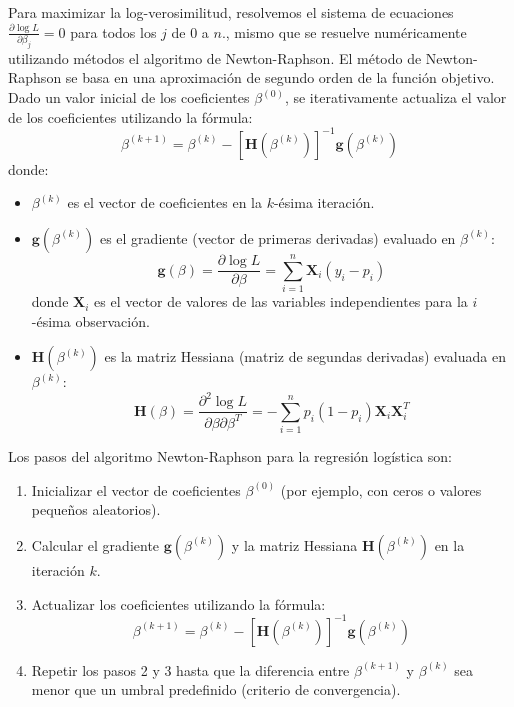 Para maximizar la log-verosimilitud, resolvemos el sistema de ecuaciones $\frac{\partial \log L}{\partial \beta_j} = 0$ para todos los $j$ de 0 a $n$., mismo que se resuelve numéricamente utilizando métodos el algoritmo de Newton-Raphson. El método de Newton-Raphson se basa en una aproximación de segundo orden de la función objetivo. Dado un valor inicial de los coeficientes $\beta^{(0)}$, se iterativamente actualiza el valor de los coeficientes utilizando la fórmula:
\begin{equation}
\beta^{(k+1)} = \beta^{(k)} - \left[ \mathbf{H}(\beta^{(k)}) \right]^{-1} \mathbf{g}(\beta^{(k)})
\end{equation}
donde:
\begin{itemize}
    \item $\beta^{(k)}$ es el vector de coeficientes en la $k$-ésima iteración.
    \item $\mathbf{g}(\beta^{(k)})$ es el gradiente (vector de primeras derivadas) evaluado en $\beta^{(k)}$:
\begin{equation}
\mathbf{g}(\beta) = \frac{\partial \log L}{\partial \beta} = \sum_{i=1}^{n} \mathbf{X}_i (y_i - p_i)
\end{equation}
donde $\mathbf{X}_i$ es el vector de valores de las variables independientes para la $i$-ésima observación.

    \item $\mathbf{H}(\beta^{(k)})$ es la matriz Hessiana (matriz de segundas derivadas) evaluada en $\beta^{(k)}$:
\begin{equation}
\mathbf{H}(\beta) = \frac{\partial^2 \log L}{\partial \beta \partial \beta^T} = -\sum_{i=1}^{n} p_i (1 - p_i) \mathbf{X}_i \mathbf{X}_i^T
\end{equation}

\end{itemize}

\begin{Algthm} Los pasos del algoritmo Newton-Raphson para la regresión logística son:
\begin{enumerate}
    \item Inicializar el vector de coeficientes $\beta^{(0)}$ (por ejemplo, con ceros o valores pequeños aleatorios).
    \item Calcular el gradiente $\mathbf{g}(\beta^{(k)})$ y la matriz Hessiana $\mathbf{H}(\beta^{(k)})$ en la iteración $k$.
    \item Actualizar los coeficientes utilizando la fórmula:
    \begin{equation}
    \beta^{(k+1)} = \beta^{(k)} - \left[ \mathbf{H}(\beta^{(k)}) \right]^{-1} \mathbf{g}(\beta^{(k)})
    \end{equation}
    \item Repetir los pasos 2 y 3 hasta que la diferencia entre $\beta^{(k+1)}$ y $\beta^{(k)}$ sea menor que un umbral predefinido (criterio de convergencia).
\end{enumerate}
\end{Algthm}

